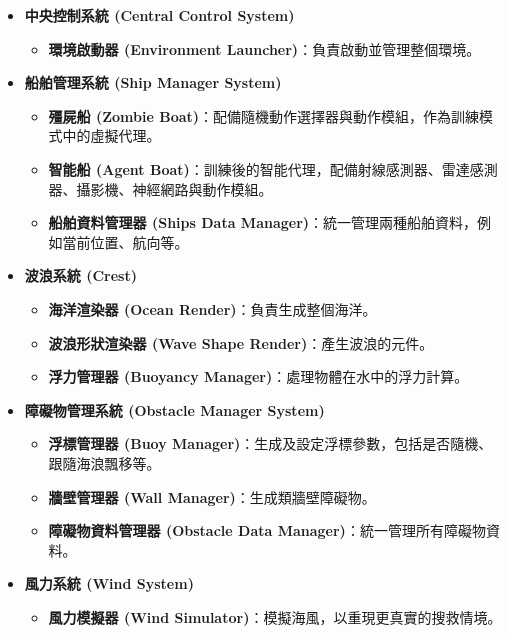 \documentclass[12pt,a4paper]{article}
\begin{document}
\begin{itemize}
	 \item \textbf{中央控制系統 (Central Control System)}
	\begin{itemize}
	    \item \textbf{環境啟動器 (Environment Launcher)}：負責啟動並管理整個環境。
	\end{itemize}
	
	 \item \textbf{船舶管理系統 (Ship Manager System)}
	\begin{itemize}
	    \item \textbf{殭屍船 (Zombie Boat)}：配備隨機動作選擇器與動作模組，作為訓練模式中的虛擬代理。
	    \item \textbf{智能船 (Agent Boat)}：訓練後的智能代理，配備射線感測器、雷達感測器、攝影機、神經網路與動作模組。
	    \item \textbf{船舶資料管理器 (Ships Data Manager)}：統一管理兩種船舶資料，例如當前位置、航向等。
	\end{itemize}
	
	 \item \textbf{波浪系統 (Crest)}
	\begin{itemize}
	    \item \textbf{海洋渲染器 (Ocean Render)}：負責生成整個海洋。
	    \item \textbf{波浪形狀渲染器 (Wave Shape Render)}：產生波浪的元件。
	    \item \textbf{浮力管理器 (Buoyancy Manager)}：處理物體在水中的浮力計算。
	\end{itemize}
	
	 \item \textbf{障礙物管理系統 (Obstacle Manager System)}
	\begin{itemize}
	    \item \textbf{浮標管理器 (Buoy Manager)}：生成及設定浮標參數，包括是否隨機、跟隨海浪飄移等。
	    \item \textbf{牆壁管理器 (Wall Manager)}：生成類牆壁障礙物。
	    \item \textbf{障礙物資料管理器 (Obstacle Data Manager)}：統一管理所有障礙物資料。
	\end{itemize}
	
	 \item \textbf{風力系統 (Wind System)}
	\begin{itemize}
	    \item \textbf{風力模擬器 (Wind Simulator)}：模擬海風，以重現更真實的搜救情境。
	\end{itemize}
	

\end{itemize}
\end{document}
